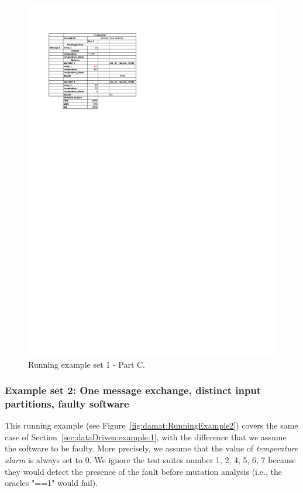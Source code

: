 \begin{figure}[tb]
\centering
\includegraphics[width=18cm]{damat/DataDrivenExample1C}
\caption{Running example set 1 - Part C.}
\label{fig:damat:RunningExample1C}
\end{figure}

%

\clearpage

\subsubsection{Example set 2: One message exchange, distinct input partitions, faulty software}
\label{sec:dataDriven:example:2}

This running example (see Figure~\ref{fig:damat:RunningExample2}) covers the same case of Section~\ref{sec:dataDriven:example:1}, with the difference that we assume the software to be faulty. More precisely, we assume that the value of \emph{temperature alarm} is always set to 0. We ignore the test suites number 1, 2, 4, 5, 6, 7 because they would detect the presence of the fault before mutation analysis (i.e., the oracles "==1" would fail).

